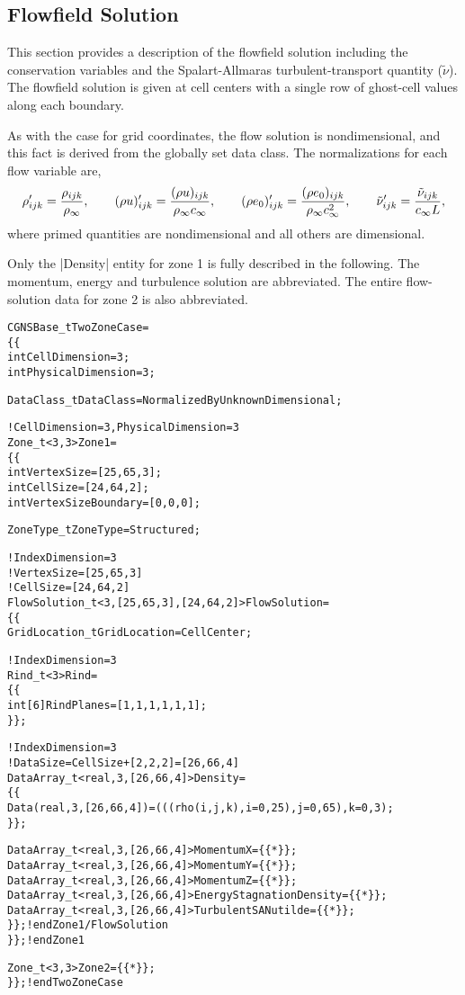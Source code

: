 \subsection{Flowfield Solution}

This section provides a description of the flowfield solution including
the conservation variables and the Spalart-Allmaras turbulent-transport
quantity ($\tilde{\nu}$).  The flowfield solution is given at cell
centers with a single row of ghost-cell values along each boundary.

As with the case for grid coordinates, the flow solution is
nondimensional, and this fact is derived from the globally set data
class.  The normalizations for each flow variable are,
$$
 \rho'_{ijk} = {\rho_{ijk} \over \rho_\infty}, \qquad
 (\rho u)'_{ijk} = {(\rho u)_{ijk} \over \rho_\infty c_\infty}, \qquad
 (\rho e_0)'_{ijk} = {(\rho e_0)_{ijk} \over \rho_\infty c_\infty^2}, \qquad
 \tilde{\nu}'_{ijk} = {\tilde{\nu}_{ijk} \over c_\infty L},
$$
where primed quantities are nondimensional and all others are dimensional.

Only the |Density| entity for zone 1 is fully described in the following.
The momentum, energy and turbulence solution are abbreviated.
The entire flow-solution data for zone 2 is also abbreviated.
\begin{alltt}
CGNSBase\_t TwoZoneCase =
  \{\{
  int CellDimension = 3 ;
  int PhysicalDimension = 3 ;

  DataClass\_t DataClass = NormalizedByUnknownDimensional ;

  !  CellDimension = 3, PhysicalDimension = 3
  Zone\_t<3,3> Zone1 =
    \{\{
    int VertexSize = [25,65,3] ;
    int CellSize   = [24,64,2] ;
    int VertexSizeBoundary = [0,0,0];

    ZoneType\_t ZoneType = Structured;

    !  IndexDimension = 3
    !  VertexSize = [25,65,3]
    !  CellSize   = [24,64,2]
    FlowSolution\_t<3, [25,65,3], [24,64,2]> FlowSolution =
      \{\{
      GridLocation\_t GridLocation = CellCenter ;

      !  IndexDimension = 3
      Rind\_t<3> Rind = 
        \{\{
        int[6] RindPlanes = [1,1,1,1,1,1] ;
        \}\} ;

      !  IndexDimension = 3
      !  DataSize = CellSize + [2,2,2] = [26,66,4]
      DataArray\_t<real, 3, [26,66,4]> Density =
        \{\{
        Data(real, 3, [26,66,4]) = (((rho(i,j,k), i=0,25), j=0,65), k=0,3) ;
        \}\} ;

      DataArray\_t<real, 3, [26,66,4]> MomentumX = \{\{*\}\} ;
      DataArray\_t<real, 3, [26,66,4]> MomentumY = \{\{*\}\} ;
      DataArray\_t<real, 3, [26,66,4]> MomentumZ = \{\{*\}\} ;
      DataArray\_t<real, 3, [26,66,4]> EnergyStagnationDensity = \{\{*\}\} ;
      DataArray\_t<real, 3, [26,66,4]> TurbulentSANutilde = \{\{*\}\} ;
      \}\} ;      ! end Zone1/FlowSolution
    \}\} ;        ! end Zone1

  Zone\_t<3,3> Zone2 = \{\{*\}\} ;
  \}\} ;          ! end TwoZoneCase
\end{alltt}

